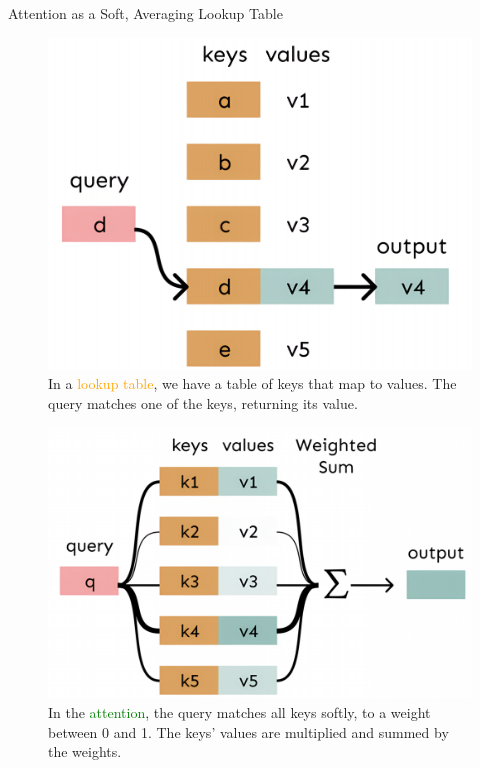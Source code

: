 \documentclass[serif, aspectratio=169]{beamer}
\begin{document}
\begin{frame}{Attention as a Soft, Averaging Lookup Table}
\begin{figure}[!htb]
    \centering
    \begin{minipage}{0.4\textwidth}
        \centering
        \includegraphics[width=\textwidth]{pic/attention-3.png}
        In a \textcolor{orange}{lookup table}, we have a table of keys that map to values. The query matches one of the keys, returning its value.
        \label{fig:attention-4}
        
    \end{minipage}%
    \hfill
    {\vrule width 1pt}
    \hfill
    \begin{minipage}{0.48\textwidth}
        \centering
        \includegraphics[width=\textwidth]{pic/attention-4.png}
                In the \textcolor{green}{attention}, the query matches all keys softly, to a weight between 0 and 1. The keys' values are multiplied and summed by the weights.
        \label{fig:attention-3}
    \end{minipage}
\end{figure}
\vfill
{}
\end{frame}
\end{document}
